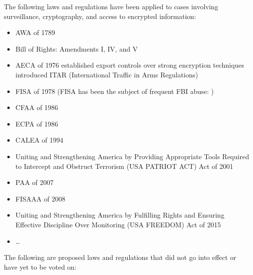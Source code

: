 The following laws and regulations have been applied to cases involving surveillance, cryptography, and access to
encrypted information:

\begin{itemize}
    \item \acf{AWA} of 1789 \cite{congress_1789}
    \item Bill of Rights: Amendments I, IV, and V \cite{madison_1791}
    \item \acf{AECA} of 1976 established export controls over strong encryption techniques
        introduced ITAR (International Traffic in Arms Regulations) \cite{morgan_hr13680_1976} \cite{kehl_right_2015}
    \item \acf{FISA} of 1978 \cite{rodino_1978}
        (FISA has been the subject of frequent FBI abuse: \cite{shamsi_2011} \cite{tucker_2020})
    \item \acf{CFAA} of 1986 \cite{hughes_hr4718_1986} \cite{wolff_computer_2016}
    \item \acf{ECPA} of 1986 \cite{kastenmeier_hr4952_1986}
    \item \acf{CALEA} of 1994 \cite{edwards_hr4922_1994}
    \item Uniting and Strengthening America by Providing Appropriate Tools Required to Intercept and Obstruct Terrorism
        (USA PATRIOT ACT) Act of 2001 \cite{sensenbrenner_2001}
    \item \acf{PAA} of 2007 \cite{mcconnell_s1927_2007}
    \item \acf{FISAAA} of 2008 \cite{reyes_hr6304_2008}
    \item Uniting and Strengthening America by Fulfilling Rights and Ensuring Effective Discipline Over Monitoring
        (USA FREEDOM) Act of 2015 \cite{sensenbrenner_2015}
    \item \dots
\end{itemize}

The following are proposed laws and regulations that did not go into effect or have yet to be voted on:

